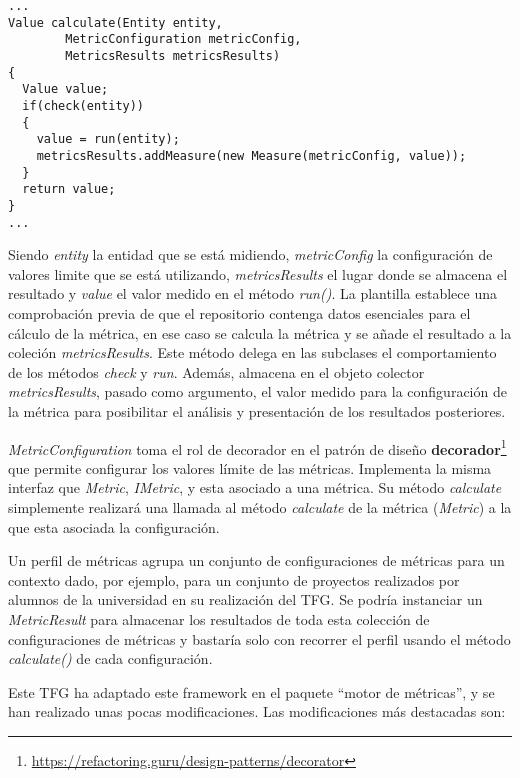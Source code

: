 \begin{minipage}{\linewidth}
\begin{verbatim}
...
Value calculate(Entity entity, 
		MetricConfiguration metricConfig, 
		MetricsResults metricsResults) 
{
  Value value;
  if(check(entity))
  {
    value = run(entity);
    metricsResults.addMeasure(new Measure(metricConfig, value));
  }
  return value;
}
...
\end{verbatim}
\end{minipage}

Siendo \textit{entity} la entidad que se está midiendo, \textit{metricConfig} la configuración de valores limite que se está utilizando, \textit{metricsResults} el lugar donde se almacena el resultado y \textit{value} el valor medido en el método \textit{run()}. La plantilla establece una comprobación previa de que el repositorio contenga datos esenciales para el cálculo de la métrica, en ese caso se calcula la métrica y se añade el resultado a la coleción \textit{metricsResults}. 
Este método delega en las subclases el comportamiento de los métodos \textit{check} y \textit{run}. Además, almacena en el objeto colector \textit{metricsResults}, pasado como argumento, el valor medido para la configuración de la métrica para posibilitar el análisis y presentación de los resultados posteriores.

\textit{MetricConfiguration} toma el rol de decorador en el patrón de diseño \textbf{decorador}\footnote{\url{https://refactoring.guru/design-patterns/decorator}} que permite configurar los valores límite de las métricas. Implementa la misma interfaz que \textit{Metric}, \textit{IMetric}, y esta asociado a una métrica. Su método \textit{calculate} simplemente realizará una llamada al método \textit{calculate} de la métrica (\textit{Metric}) a la que esta asociada la configuración.

Un perfil de métricas agrupa un conjunto de configuraciones de métricas para un contexto dado, por ejemplo, para un conjunto de proyectos realizados por alumnos de la universidad en su realización del TFG. Se podría instanciar un \textit{MetricResult} para almacenar los resultados de toda esta colección de configuraciones de métricas y bastaría solo con recorrer el perfil usando el método \textit{calculate()} de cada configuración.

Este TFG ha adaptado este framework en el paquete ``motor de métricas'', y se han realizado unas pocas modificaciones. Las modificaciones más destacadas son:

